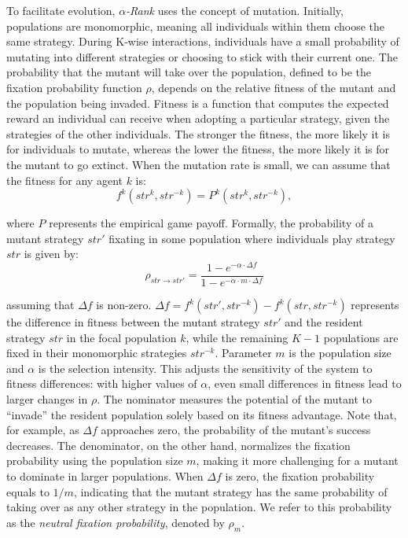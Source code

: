 \begin{flushleft}
\begin{flushleft}
        To facilitate evolution, \emph{$\alpha$-Rank} uses the concept of mutation. Initially, populations are monomorphic, meaning all individuals within them choose the same strategy. During K-wise interactions, individuals have a small probability of mutating into different strategies or choosing to stick with their current one. The probability that the mutant will take over the population, defined to be the fixation probability function $\rho$, depends on the relative fitness of the mutant and the population being invaded. Fitness is a function that computes the expected reward an individual can receive when adopting a particular strategy, given the strategies of the other individuals. The stronger the fitness, the more likely it is for individuals to mutate, whereas the lower the fitness, the more likely it is for the mutant to go extinct. When the mutation rate is small, we can assume that the fitness for any agent $k$ is:
        \begin{equation}
            f^k(str^{k}, str^{-k}) = P^k(str^{k}, str^{-k}),
            \label{eq:fitness_k}
        \end{equation}

        where $P$ represents the empirical game payoff. Formally, the probability of a mutant strategy $str'$ fixating in some population where individuals play strategy $str$ is given by:
        \begin{equation}
            \rho_{str \to str'} = \frac{1 - e^{-\alpha \cdot \Delta f}}{1 - e^{-\alpha \cdot m \cdot \Delta f}} 
            \label{eq:fixation_prob}
        \end{equation}

        assuming that $\Delta f$ is non-zero. $\Delta f = f^k(str', str^{-k}) - f^k(str, str^{-k})$ represents the difference in fitness between the mutant strategy $str'$ and the resident strategy $str$ in the focal population $k$, while the remaining $K - 1$ populations are fixed in their monomorphic strategies $str^{-k}$. Parameter $m$ is the population size and $\alpha$ is the selection intensity. This adjusts the sensitivity of the system to fitness differences: with higher values of $\alpha$, even small differences in fitness lead to larger changes in $\rho$. The nominator measures the potential of the mutant to ``invade'' the resident population solely based on its fitness advantage. Note that, for example, as $\Delta f$ approaches zero, the probability of the mutant's success decreases. The denominator, on the other hand, normalizes the fixation probability using the population size $m$, making it more challenging for a mutant to dominate in larger populations. When $\Delta f$ is zero, the fixation probability equals to $1/m$, indicating that the mutant strategy has the same probability of taking over as any other strategy in the population. We refer to this probability as the \emph{neutral fixation probability}, denoted by $\rho_m$.


\end{flushleft}
\end{flushleft}
